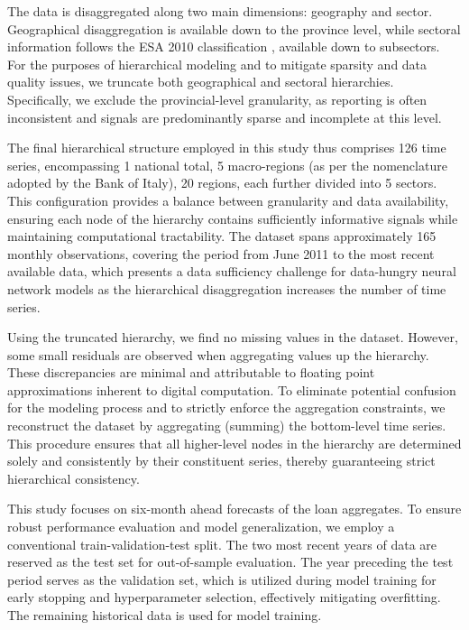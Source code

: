 \documentclass[letterpaper]{article}
\begin{document}
The data is disaggregated along two main dimensions: geography and sector. 
Geographical disaggregation is available down to the province level, while sectoral information follows the ESA 2010 classification \cite{esa2010}, available down to subsectors. 
For the purposes of hierarchical modeling and to mitigate sparsity and data quality issues, we truncate both geographical and sectoral hierarchies. 
Specifically, we exclude the provincial-level granularity, as reporting is often inconsistent and signals are predominantly sparse and incomplete at this level.

The final hierarchical structure employed in this study thus comprises 126 time series, encompassing 1 national total, 5 macro-regions (as per the nomenclature adopted by the Bank of Italy), 20 regions, each further divided into 5 sectors. 
This configuration provides a balance between granularity and data availability, ensuring each node of the hierarchy contains sufficiently informative signals while maintaining computational tractability. 
The dataset spans approximately 165 monthly observations, covering the period from June 2011 to the most recent available data, which presents a data sufficiency challenge for data-hungry neural network models as the hierarchical disaggregation increases the number of time series.

Using the truncated hierarchy, we find no missing values in the dataset. 
However, some small residuals are observed when aggregating values up the hierarchy. 
These discrepancies are minimal and attributable to floating point approximations inherent to digital computation. 
To eliminate potential confusion for the modeling process and to strictly enforce the aggregation constraints, we reconstruct the dataset by aggregating (summing) the bottom-level time series.
This procedure ensures that all higher-level nodes in the hierarchy are determined solely and consistently by their constituent series, thereby guaranteeing strict hierarchical consistency.

This study focuses on six-month ahead forecasts of the loan aggregates. 
To ensure robust performance evaluation and model generalization, we employ a conventional train-validation-test split. 
The two most recent years of data are reserved as the test set for out-of-sample evaluation. 
The year preceding the test period serves as the validation set, which is utilized during model training for early stopping and hyperparameter selection, effectively mitigating overfitting. 
The remaining historical data is used for model training.
\end{document}
